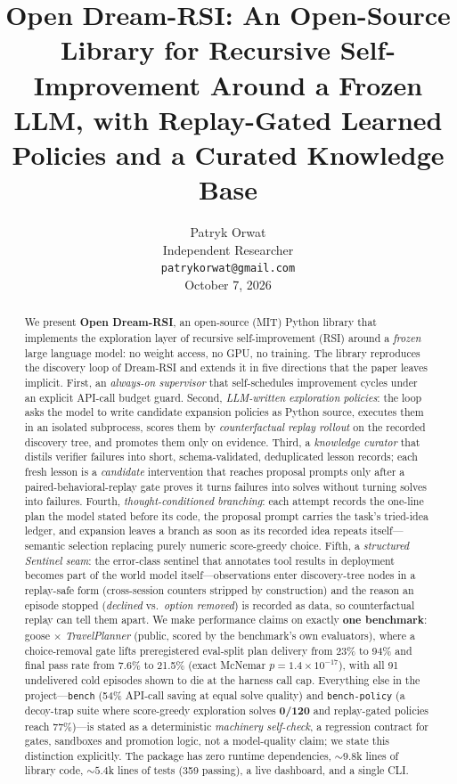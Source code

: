 \documentclass[11pt,a4paper]{article}
\title{\bfseries Open Dream-RSI: An Open-Source Library for Recursive
Self-Improvement Around a Frozen LLM, with Replay-Gated Learned Policies and a
Curated Knowledge Base}
\author{%
Patryk Orwat\\
Independent Researcher\\
\texttt{patrykorwat@gmail.com}\\[2pt]
\small October 7, 2026
}
\date{}
\begin{document}
\maketitle

\begin{abstract}
We present \textbf{Open Dream-RSI}, an open-source (MIT) Python library that
implements the exploration layer of recursive self-improvement (RSI) around a
\emph{frozen} large language model: no weight access, no GPU, no training. The
library reproduces the discovery loop of Dream-RSI \cite{dreamrsi} and extends
it in five directions that the paper leaves implicit. First, an
\emph{always-on supervisor} that self-schedules improvement cycles under an
explicit API-call budget guard. Second, \emph{LLM-written exploration
policies}: the loop asks the model to write candidate expansion policies as
Python source, executes them in an isolated subprocess, scores them by
\emph{counterfactual replay rollout} on the recorded discovery tree, and
promotes them only on evidence. Third, a \emph{knowledge curator} that distils
verifier failures into short, schema-validated, deduplicated lesson records;
each fresh lesson is a \emph{candidate} intervention that reaches proposal
prompts only after a paired-behavioral-replay gate proves it turns failures
into solves without turning solves into failures. Fourth,
\emph{thought-conditioned branching}: each attempt records the one-line plan
the model stated before its code, the proposal prompt carries the task's
tried-idea ledger, and expansion leaves a branch as soon as its recorded idea
repeats itself---semantic selection replacing purely numeric score-greedy
choice. Fifth, a \emph{structured Sentinel seam}: the error-class sentinel
that annotates tool results in deployment becomes part of the world model
itself---observations enter discovery-tree nodes in a replay-safe form
(cross-session counters stripped by construction) and the reason an episode
stopped (\emph{declined} vs.\ \emph{option removed}) is recorded as data, so
counterfactual replay can tell them apart.
We make performance claims on exactly \textbf{one benchmark}: goose
$\times$ \emph{TravelPlanner} (public, scored by the benchmark's own
evaluators), where a choice-removal gate lifts preregistered eval-split plan
delivery from 23\% to 94\% and final pass rate from 7.6\% to 21.5\%
(exact McNemar $p{=}1.4{\times}10^{-17}$), with all 91 undelivered cold
episodes shown to die at the harness call cap. Everything else in the
project---\texttt{bench} (54\% API-call saving at equal solve quality) and
\texttt{bench-policy} (a decoy-trap suite where score-greedy exploration
solves \textbf{0/120} and replay-gated policies reach 77\%)---is stated as a
deterministic \emph{machinery self-check}, a regression contract for gates,
sandboxes and promotion logic, not a model-quality claim; we state this
distinction explicitly. The package has zero runtime dependencies,
${\sim}9.8$k lines of library code, ${\sim}5.4$k lines of tests (359
passing), a live dashboard, and a single CLI.
\end{abstract}
\end{document}
